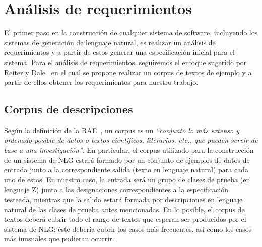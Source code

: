 \chapter{Análisis de requerimientos}
\label{cap:corpus}

El primer paso en la construcción de cualquier sistema de software, incluyendo los sistemas de generación de lenguaje natural, es realizar un análisis de requerimientos y a partir de estos generar una especificación inicial para el sistema. Para el análisis de requerimientos, seguiremos el enfoque sugerido por Reiter y Dale~\cite{reiter_dale} en el cual se propone realizar un corpus de textos de ejemplo y a partir de ellos obtener los requerimientos para nuestro trabajo.

\section{Corpus de descripciones}                 

Según la definición de la RAE~\cite{dicrae}, un corpus es un \emph{``conjunto lo más extenso y ordenado posible de datos o textos científicos, literarios, etc., que pueden servir de base a una investigación''}. En particular, el corpus utilizado para la construcción de un sistema de NLG estará formado por un conjunto de ejemplos de datos de entrada junto a la correspondiente salida (texto en lenguaje natural) para cada uno de estos. En nuestro caso, la entrada será un grupo de clases de prueba (en lenguaje Z) junto a las designaciones correspondientes a la especificación testeada, mientras que la salida estará formada por descripciones en lenguaje natural de las clases de prueba antes mencionadas. En lo posible, el corpus de textos deberá cubrir todo el rango de textos que esperan ser producidos por el sistema de NLG; éste debería cubrir los casos más frecuentes, así como los casos más inusuales que pudieran ocurrir.

